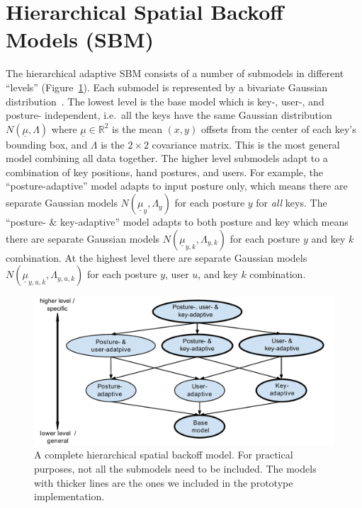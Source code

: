 \documentclass{sigchi}
\begin{document}
\section{Hierarchical Spatial Backoff Models (SBM)}
The hierarchical adaptive SBM consists of a number of submodels in different
``levels'' (Figure~\ref{fig:hierarchy}). Each submodel is represented by a
bivariate Gaussian distribution~\cite{Azenkot:2012,
Goodman:2002, Rashid:2008}.
The lowest level is the base model which is key-, user-, and posture-
independent, i.e.\ all the keys have the same Gaussian
distribution $N(\underline\mu, \Lambda)$ where $\underline\mu \in \mathbb{R}^2$ is the mean
$(x, y)$ offsets from the center of each key's bounding box, and $\Lambda$ is
the $2\times 2$ covariance matrix. This is the most general model combining all 
data together. The higher level submodels adapt to a combination of key
positions,  hand postures, and users. For example, the ``posture-adaptive''
model adapts to input posture only, which means there are separate Gaussian 
models $N(\underline\mu_y, \Lambda_y)$ for each posture $y$ for \textit{all}
keys. The ``posture- \& key-adaptive'' model adapts to both posture and key which means 
there are separate Gaussian models $N(\underline\mu_{y, k}, \Lambda_{y, k})$ for
each posture $y$ and key $k$ combination.  At the highest level there are
separate Gaussian models $N(\underline\mu_{y,u,k},
\Lambda_{y,u,k})$ for each posture $y$, user $u$, and key $k$ combination.

\begin{figure}[tb]
  \centering
  \includegraphics[width=1\columnwidth,height=0.6\columnwidth]{figures/hierarchy-embed-font.pdf}
  \caption{A complete hierarchical spatial backoff model. For practical purposes, not all the submodels need to be included. The models with thicker lines are the ones we included in the prototype implementation.}
  \label{fig:hierarchy}
\end{figure}
\end{document}
